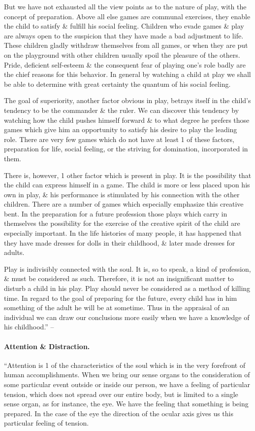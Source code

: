 \documentclass{article}
\begin{document}
But we have not exhausted all the view points as to the nature of play, with the concept of preparation. Above all else games are communal exercises, they enable the child to satisfy \& fulfill his social feeling. Children who evade games \& play are always open to the suspicion that they have made a bad adjustment to life. These children gladly withdraw themselves from all games, or when they are put on the playground with other children usually spoil the pleasure of the others. Pride, deficient self-esteem \& the consequent fear of playing one's role badly are the chief reasons for this behavior. In general by watching a child at play we shall be able to determine with great certainty the quantum of his social feeling.

The goal of superiority, another factor obvious in play, betrays itself in the child's tendency to be the commander \& the ruler. We can discover this tendency by watching how the child pushes himself forward \& to what degree he prefers those games which give him an opportunity to satisfy his desire to play the leading role. There are very few games which do not have at least 1 of these factors, preparation for life, social feeling, or the striving for domination, incorporated in them.

There is, however, 1 other factor which is present in play. It is the possibility that the child can express himself in a game. The child is more or less placed upon his own in play, \& his performance is stimulated by his connection with the other children. There are a number of games which especially emphasize this creative bent. In the preparation for a future profession those plays which carry in themselves the possibility for the exercise of the creative spirit of the child are especially important. In the life histories of many people, it has happened that they have made dresses for dolls in their childhood, \& later made dresses for adults.

Play is indivisibly connected with the soul. It is, so to speak, a kind of profession, \& must be considered as such. Therefore, it is not an insignificant matter to disturb a child in his play. Play should never be considered as a method of killing time. In regard to the goal of preparing for the future, every child has in him something of the adult he will be at sometime. Thus in the appraisal of an individual we can draw our conclusions more easily when we have a knowledge of his childhood.'' -- \cite[pp. 91--93]{Adler_human_nature}

\paragraph{Attention \& Distraction.} ``Attention is 1 of the characteristics of the soul which is in the very forefront of human accomplishments. When we bring our sense organs to the consideration of some particular event outside or inside our person, we have a feeling of particular tension, which does not spread over our entire body, but is limited to a single sense organ, as for instance, the eye. We have the feeling that something is being prepared. In the case of the eye the direction of the ocular axis gives us this particular feeling of tension.
\end{document}
